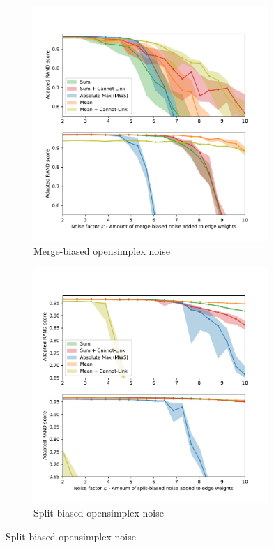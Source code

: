 \begin{figure}
\centering
        \begin{subfigure}[t]{0.48 \textwidth}
        \centering
        \includegraphics[width=0.98\textwidth,trim=0.35in 0.35in 0.35in 0.35in,clip]{./figs/merge_noise.pdf}

        \caption{Merge-biased opensimplex noise} \label{fig:thresh}
    \end{subfigure}%
    \begin{subfigure}[t]{0.48 \textwidth}
        \centering
        \includegraphics[width=0.98\textwidth,trim=0.29in 0.31in 0.31in 0.31in,clip]{./figs/split_noise.pdf}
        \caption{Split-biased opensimplex noise} \label{fig:ws}
    \end{subfigure}



\end{figure}
